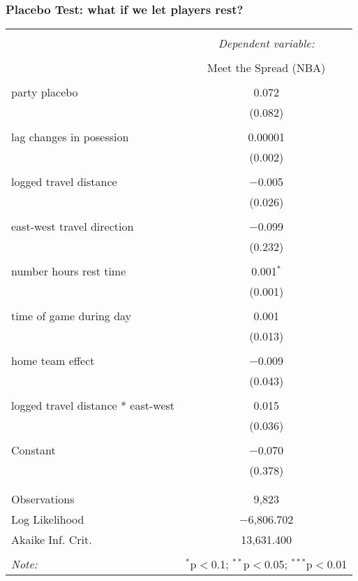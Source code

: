 \documentclass{beamer}
\begin{document}
\begin{frame}   \frametitle{Placebo Test: what if we let players rest?}
  \centering
  \tiny{
  \begin{tabular}{@{\extracolsep{5pt}}lc}  \\[-1.8ex]\hline  \hline \\[-1.8ex]   & \multicolumn{1}{c}{\textit{Dependent variable:}} \\  \cline{2-2}  \\[-1.8ex] & Meet the Spread (NBA) \\  \hline \\[-1.8ex]   party placebo & 0.072 \\    & (0.082) \\    & \\   lag changes in posession & 0.00001 \\    & (0.002) \\    & \\   logged travel distance & $-$0.005 \\    & (0.026) \\    & \\   east-west travel direction & $-$0.099 \\    & (0.232) \\    & \\   number hours rest time & 0.001$^{*}$ \\    & (0.001) \\    & \\   time of game during day & 0.001 \\    & (0.013) \\    & \\   home team effect & $-$0.009 \\    & (0.043) \\    & \\   logged travel distance * east-west & 0.015 \\    & (0.036) \\    & \\   Constant & $-$0.070 \\    & (0.378) \\    & \\  \hline \\[-1.8ex]  Observations & 9,823 \\  Log Likelihood & $-$6,806.702 \\  Akaike Inf. Crit. & 13,631.400 \\  \hline  \hline \\[-1.8ex]  \textit{Note:}  & \multicolumn{1}{r}{$^{*}$p$<$0.1; $^{**}$p$<$0.05; $^{***}$p$<$0.01} \\  \end{tabular}  
} \end{frame}
\end{document}
